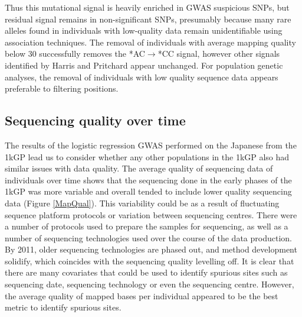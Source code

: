 \documentclass[9pt,lineno]{elife}
\begin{document}
Thus this mutational signal is heavily enriched in GWAS suspicious SNPs, but residual signal remains in non-significant SNPs, presumably because many rare alleles found in individuals with low-quality data remain unidentifiable using association techniques. 
The removal of individuals with average mapping quality below 30 successfully removes the *AC${\rightarrow}$*CC signal, however other signals identified by Harris and Pritchard appear unchanged. 
For population genetic analyses, the removal of individuals with low quality sequence data appears preferable to filtering positions.

	\subsection{Sequencing quality over time}
The results of the logistic regression GWAS performed on the Japanese from the 1kGP lead us to consider whether any other populations in the 1kGP also had similar issues with data quality.
The average quality of sequencing data of individuals over time shows that the sequencing done in the early phases of the 1kGP was more variable and overall tended to include lower quality sequencing data (Figure \ref{MapQual}).
This variability could be as a result of fluctuating sequence platform protocols or variation between sequencing centres.
There were a number of protocols used to prepare the samples for sequencing, as well as a number of sequencing technologies used over the course of the data production.
By 2011, older sequencing technologies are phased out, and method development solidify, which coincides with the sequencing quality levelling off.
It is clear that there are many covariates that could be used to identify spurious sites such as sequencing date, sequencing technology or even the sequencing centre. 
However, the average quality of mapped bases per individual appeared to be the best metric to identify spurious sites.
\end{document}
